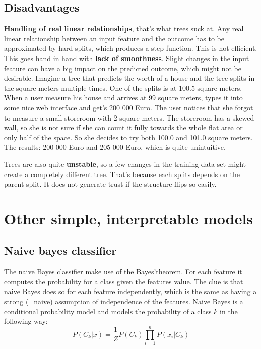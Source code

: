 \documentclass[12pt,]{krantz}
\theoremstyle{definition}
\theoremstyle{definition}
\theoremstyle{definition}
\theoremstyle{remark}
\begin{document}
\subsection{Disadvantages}\label{disadvantages}

\textbf{Handling of real linear relationships}, that's what trees suck
at. Any real linear relationship between an input feature and the
outcome has to be approximated by hard splits, which produces a step
function. This is not efficient. This goes hand in hand with
\textbf{lack of smoothness}. Slight changes in the input feature can
have a big impact on the predicted outcome, which might not be
desirable. Imagine a tree that predicts the worth of a house and the
tree splits in the square meters multiple times. One of the splits is at
100.5 square meters. When a user measure his house and arrives at 99
square meters, types it into some nice web interface and get's 200 000
Euro. The user notices that she forgot to measure a small storeroom with
2 square meters. The storeroom has a skewed wall, so she is not sure if
she can count it fully towards the whole flat area or only half of the
space. So she decides to try both 100.0 and 101.0 square meters. The
results: 200 000 Euro and 205 000 Euro, which is quite unintuitive.

Trees are also quite \textbf{unstable}, so a few changes in the training
data set might create a completely different tree. That's because each
splits depends on the parent split. It does not generate trust if the
structure flips so easily.

\section{Other simple, interpretable
models}\label{other-simple-interpretable-models}

\subsection{Naive bayes classifier}\label{naive-bayes-classifier}

The naive Bayes classifier make use of the Bayes'theorem. For each
feature it computes the probability for a class given the features
value. The clue is that naive Bayes does so for each feature
independently, which is the same as having a strong (=naive) assumption
of independence of the features. Naive Bayes is a conditional
probability model and models the probability of a class \(k\) in the
following way:
\[ P(C_k|x) = \frac{1}{Z} P(C_k) \prod_{i=1}^n P(x_i | C_k)\]
\end{document}
